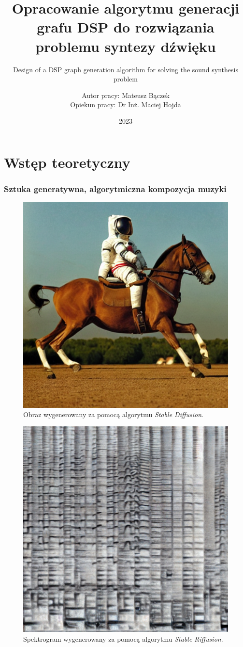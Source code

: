 \documentclass[]{beamer}
\title{Opracowanie algorytmu generacji grafu DSP do rozwiązania problemu syntezy dźwięku}
\subtitle{Design of a DSP graph generation algorithm for solving the sound synthesis problem}
\author{Autor pracy: Mateusz Bączek \\ Opiekun pracy: Dr Inż. Maciej Hojda}
\date{2023}
\begin{document}
\onehalfspacing
\frame{\titlepage}

\section{Wstęp teoretyczny}


\begin{frame}
  \frametitle{Sztuka generatywna, algorytmiczna kompozycja muzyki}

  \begin{multicols}{2}

  \begin{figure}
    \includegraphics[width=0.9\linewidth]{stable_diffusion.png}
    \caption{Obraz wygenerowany za pomocą algorytmu \textit{Stable Diffusion}.}
  \end{figure}

  \begin{figure}
    \includegraphics[width=0.8\linewidth]{riffusion_spectro.jpg}
    \caption{Spektrogram wygenerowany za pomocą algorytmu \textit{Stable Riffusion}.}
  \end{figure}


\end{multicols}
\end{frame}
\end{document}
